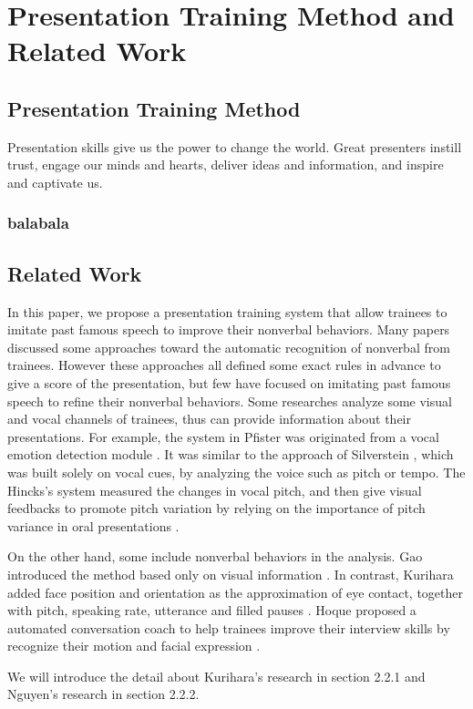 \chapter[Presentation Training Method and Related Work]{Presentation Training Method and\\ Related Work}
\section{Presentation Training Method}
\par Presentation skills give us the power to change the world. Great presenters instill trust, engage our minds and hearts, deliver ideas and information, and inspire and captivate us.
\subsection{balabala}

\section{Related Work}
\par In this paper, we propose a presentation training system that allow trainees to imitate past famous speech to improve their nonverbal behaviors. Many papers discussed some approaches toward the automatic recognition of nonverbal from trainees. However these approaches all defined some exact rules in advance to give a score of the presentation, but few have focused on imitating past famous speech to refine their nonverbal behaviors. Some researches analyze some visual and vocal channels of trainees, thus can provide information about their presentations. For example, the system in Pfister was originated from a vocal emotion detection module \cite{pfister2011real}. It was similar to the approach of Silverstein \cite{Silverstein2006}, which was built solely on vocal cues, by analyzing the voice such as pitch or tempo. The Hincks's system measured the changes in vocal pitch, and then give visual feedbacks to promote pitch variation by relying on the importance of pitch variance in oral presentations \cite{hincks2009promoting}.
\par On the other hand, some include nonverbal behaviors in the analysis. Gao introduced the method based only on visual information \cite{Gao}. In contrast, Kurihara added face position and orientation as the approximation of eye contact, together with pitch, speaking rate, utterance and filled pauses \cite{Kurihara2007}. Hoque proposed a automated conversation coach to help trainees improve their interview skills by recognize their motion and facial expression \cite{Kurihara2007}.
\par We will introduce the detail about Kurihara's research \cite{Kurihara2007} in section 2.2.1 and Nguyen's research \cite{nguyen2015intelligent} in section 2.2.2. 

